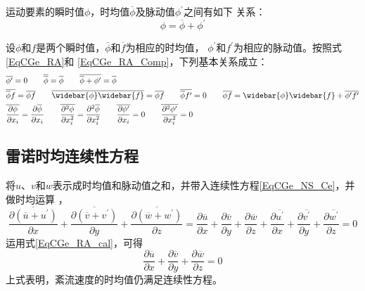 运动要素的瞬时值$\phi$，时均值$\overline{\phi}$及脉动值$\phi^{\prime}$之间有如下
关系：
\begin{equation}
  \phi = \overline{\phi} + \phi^{\prime}
  \label{EqCGe_RA_Comp}
\end{equation}

设$\phi$和$f$是两个瞬时值，$\overline{\phi}$和$\overline{f}$为相应的时均值，
$\phi^{\prime}$和$f^{\prime}$为相应的脉动值。按照式\eqref{EqCGe_RA}和
\eqref{EqCGe_RA_Comp}，下列基本关系成立：
\begin{equation}
  \begin{aligned}
    &\overline{\phi^{\prime}} = 0
    \quad\quad
    \overline{\overline{\phi}} = \overline{\phi}
    \quad\quad
    \overline{\overline{\phi}+\phi^{\prime}} = \overline{\phi}
    \\
    & \overline{\overline{\phi}f} = \overline{\phi}\overline{f}
    \quad\quad
    \overline{\widebar{\phi}\widebar{f}} = \overline{\phi}\overline{f}
    \quad\quad
    \overline{\overline{\phi}f^{\prime}} = 0
    \quad\quad
    \overline{\phi f} = \widebar{\phi}\widebar{f} +
    \overline{\phi^{\prime}f^{\prime}}
    \\
    & \overline{\frac{\partial\phi}{\partial x_{i}}} = \frac{\partial \overline{\phi}}{\partial x_{i}}
    \quad\quad
    \overline{\frac{\partial^{2}\phi}{\partial x_{i}^{2}}} = \frac{\partial^{2}
    \overline{\phi}}{\partial x_{i}^{2}}
    \quad\quad
    \overline{\frac{\partial\phi^{\prime}}{\partial x_{i}}} = 0
    \quad\quad
    \overline{\frac{\partial^{2}\phi^{\prime}}{\partial x_{i}^{2}}} = 0
  \end{aligned}
  \label{EqCGe_RA_cal}
\end{equation}

\subsection{雷诺时均连续性方程}
将$u$、$v$和$w$表示成时均值和脉动值之和，并带入连续性方程\eqref{EqCGe_NS_Ce}，并做时均运算
，
\begin{equation*}
  \overline{
    \frac{\partial(\overline{u}+u^{\prime})}{\partial x}
  }
  +
  \overline{
    \frac{\partial(\overline{v}+v^{\prime})}{\partial y}
  }
  +
  \overline{
    \frac{\partial(\overline{w}+w^{\prime})}{\partial z}
  }
  =
  \frac{\partial \overline{u}}{\partial x} +
  \frac{\partial \overline{v}}{\partial y} +
  \frac{\partial \overline{w}}{\partial z} +
  \frac{\partial \overline{u^{\prime}}}{\partial x} +
  \frac{\partial \overline{v^{\prime}}}{\partial y} +
  \frac{\partial \overline{w^{\prime}}}{\partial z}
  =0
\end{equation*}
运用式\eqref{EqCGe_RA_cal}，可得
\begin{equation}
  \frac{\partial \overline{u}}{\partial x} +
  \frac{\partial \overline{v}}{\partial y} +
  \frac{\partial \overline{w}}{\partial z}
  =
  0
\end{equation}
上式表明，紊流速度的时均值仍满足连续性方程。

